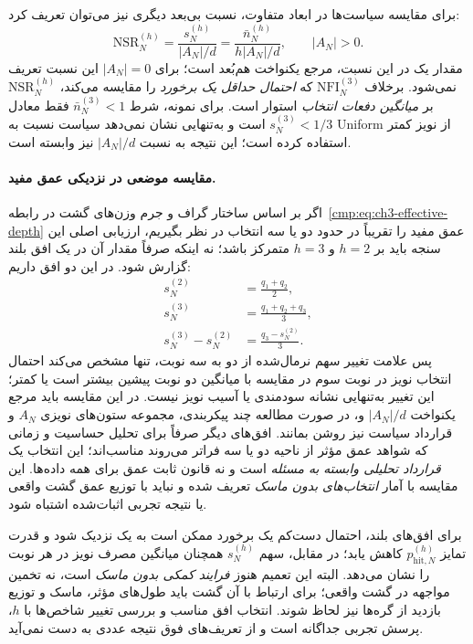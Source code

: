 برای مقایسه سیاست‌ها در ابعاد متفاوت،
نسبت بی‌بعد دیگری نیز می‌توان تعریف کرد:
\begin{equation}\label{cmp:eq:ch3-noise-normalized-uniform-ratio}
\mathrm{NSR}_N^{(h)}
=\frac{s_N^{(h)}}{|A_N|/d}
=\frac{\bar n_N^{(h)}}{h|A_N|/d},
\qquad |A_N|>0.
\end{equation}
مقدار یک در این نسبت، مرجع یکنواخت
هم‌بُعد است؛ برای $|A_N|=0$ این نسبت
تعریف نمی‌شود. برخلاف
$\mathrm{NFI}_N^{(3)}$ که
\emph{احتمال حداقل یک برخورد} را مقایسه می‌کند،
$\mathrm{NSR}_N^{(h)}$ بر
\emph{میانگین دفعات انتخاب} استوار است.
برای نمونه، شرط $\bar n_N^{(3)}<1$
فقط معادل $s_N^{(3)}<1/3$ است
و به‌تنهایی نشان نمی‌دهد سیاست نسبت
به Uniform از نویز کمتر استفاده کرده است؛
این نتیجه به نسبت $|A_N|/d$ نیز وابسته است.

\paragraph{مقایسه موضعی در نزدیکی عمق مفید.}
اگر بر اساس ساختار گراف و جرم وزن‌های گشت
در رابطه~\eqref{cmp:eq:ch3-effective-depth}
عمق مفید را تقریباً در حدود دو یا سه انتخاب
در نظر بگیریم، ارزیابی اصلی این سنجه
باید بر $h=2$ و $h=3$ متمرکز باشد؛
نه اینکه صرفاً مقدار آن در یک افق بلند
گزارش شود. در این دو افق داریم:
\begin{equation}\label{cmp:eq:ch3-noise-local-depth-comparison}
\boxed{
\begin{aligned}
s_N^{(2)}&=\frac{q_1+q_2}{2},\\
s_N^{(3)}&=\frac{q_1+q_2+q_3}{3},\\
s_N^{(3)}-s_N^{(2)}
&=\frac{q_3-s_N^{(2)}}{3}.
\end{aligned}}
\end{equation}
پس علامت تغییر سهم نرمال‌شده از دو
به سه نوبت، تنها مشخص می‌کند احتمال
انتخاب نویز در نوبت سوم در مقایسه
با میانگین دو نوبت پیشین بیشتر است
یا کمتر؛ این تغییر به‌تنهایی
نشانه سودمندی یا آسیب نویز نیست.
در این مقایسه باید مرجع یکنواخت
$|A_N|/d$ و، در صورت مطالعه چند پیکربندی،
مجموعه ستون‌های نویزی $A_N$
و قرارداد سیاست نیز روشن بمانند.
افق‌های دیگر صرفاً برای تحلیل حساسیت
و زمانی که شواهد عمق مؤثر از ناحیه
دو یا سه فراتر می‌روند مناسب‌اند؛
این انتخاب یک \emph{قرارداد تحلیلی
وابسته به مسئله} است و نه قانون
ثابت عمق برای همه داده‌ها.
این مقایسه با آمار
\emph{انتخاب‌های بدون ماسک} تعریف
شده و نباید با توزیع عمق گشت واقعی
یا نتیجه تجربی اثبات‌شده اشتباه شود.

برای افق‌های بلند، احتمال دست‌کم یک برخورد
ممکن است به یک نزدیک شود و قدرت تمایز
$ p_{\mathrm{hit},N}^{(h)} $
کاهش یابد؛ در مقابل، سهم $s_N^{(h)}$
همچنان میانگین مصرف نویز در هر نوبت را
نشان می‌دهد. البته این تعمیم هنوز
\emph{فرایند کمکی بدون ماسک} است،
نه تخمین مواجهه در گشت واقعی؛
برای ارتباط با آن گشت باید طول‌های مؤثر،
ماسک و توزیع بازدید از گره‌ها نیز لحاظ شوند.
انتخاب افق مناسب و بررسی تغییر شاخص‌ها با
$h$، پرسش تجربی جداگانه است و از
تعریف‌های فوق نتیجه عددی به دست نمی‌آید.



